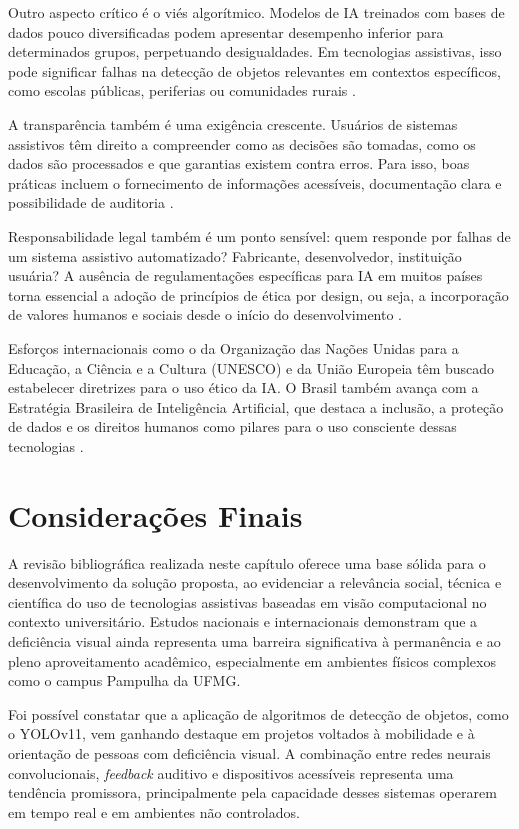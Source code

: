 Outro aspecto crítico é o viés algorítmico. Modelos de IA treinados com bases de dados pouco diversificadas podem apresentar desempenho inferior para determinados grupos, perpetuando desigualdades. Em tecnologias assistivas, isso pode significar falhas na detecção de objetos relevantes em contextos específicos, como escolas públicas, periferias ou comunidades rurais \cite{Buolamwini2018}.

A transparência também é uma exigência crescente. Usuários de sistemas assistivos têm direito a compreender como as decisões são tomadas, como os dados são processados e que garantias existem contra erros. Para isso, boas práticas incluem o fornecimento de informações acessíveis, documentação clara e possibilidade de auditoria \cite{Morley2020}.

Responsabilidade legal também é um ponto sensível: quem responde por falhas de um sistema assistivo automatizado? Fabricante, desenvolvedor, instituição usuária? A ausência de regulamentações específicas para IA em muitos países torna essencial a adoção de princípios de ética por design, ou seja, a incorporação de valores humanos e sociais desde o início do desenvolvimento \cite{Dignum2019}.

Esforços internacionais como o da Organização das Nações Unidas para a Educação, a Ciência e a Cultura (UNESCO) e da União Europeia têm buscado estabelecer diretrizes para o uso ético da IA. O Brasil também avança com a Estratégia Brasileira de Inteligência Artificial, que destaca a inclusão, a proteção de dados e os direitos humanos como pilares para o uso consciente dessas tecnologias \cite{MCTI2021}.

\section{\textbf{Considerações Finais}}

A revisão bibliográfica realizada neste capítulo oferece uma base sólida para o desenvolvimento da solução proposta, ao evidenciar a relevância social, técnica e científica do uso de tecnologias assistivas baseadas em visão computacional no contexto universitário. Estudos nacionais e internacionais demonstram que a deficiência visual ainda representa uma barreira significativa à permanência e ao pleno aproveitamento acadêmico, especialmente em ambientes físicos complexos como o campus Pampulha da UFMG.

Foi possível constatar que a aplicação de algoritmos de detecção de objetos, como o YOLOv11, vem ganhando destaque em projetos voltados à mobilidade e à orientação de pessoas com deficiência visual. A combinação entre redes neurais convolucionais, \textit{feedback} auditivo e dispositivos acessíveis representa uma tendência promissora, principalmente pela capacidade desses sistemas operarem em tempo real e em ambientes não controlados.

